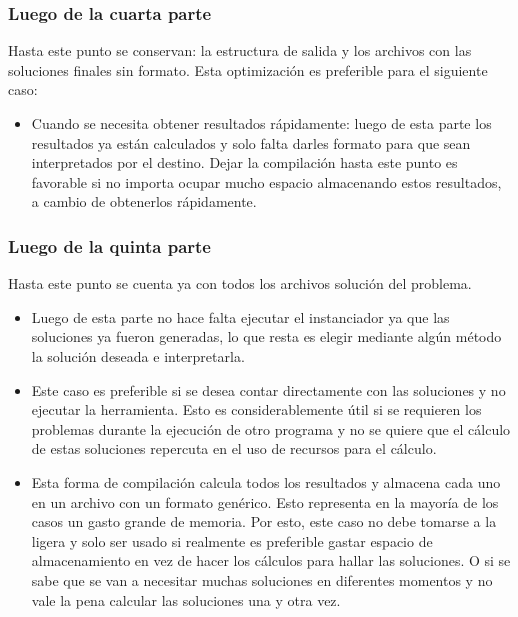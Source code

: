 \subsubsection{Luego de la cuarta parte}
Hasta este punto se conservan: la estructura de salida y los archivos con las 
soluciones finales sin formato. Esta optimización es preferible para el 
siguiente caso:

\begin{itemize}
\item {Cuando se necesita obtener resultados rápidamente: luego de esta parte
los resultados ya están calculados y solo falta darles formato para que
sean interpretados por el destino. Dejar la compilación hasta este punto es 
favorable si no importa ocupar mucho espacio almacenando estos resultados,
a cambio de obtenerlos rápidamente.} 
\end{itemize}

\subsubsection{Luego de la quinta parte}
Hasta este punto se cuenta ya con todos los archivos solución del problema.

\begin{itemize}
\item {Luego de esta parte no hace falta ejecutar el instanciador ya que las 
soluciones ya fueron generadas, lo que resta es elegir mediante algún
método la solución deseada e interpretarla.}

\item{Este caso es preferible si se desea contar directamente con las 
soluciones y no ejecutar la herramienta. Esto es considerablemente útil si 
se requieren los problemas durante la ejecución de otro programa y no se
quiere que el cálculo de estas soluciones repercuta en el uso de recursos
para el cálculo.}

\item{Esta forma de compilación calcula todos los resultados y almacena cada
uno en un archivo con un formato genérico. Esto representa en la mayoría de los
casos un gasto grande de memoria. Por esto, este caso no debe tomarse a la ligera
y solo ser usado si realmente es preferible gastar espacio de almacenamiento
en vez de hacer los cálculos para hallar las soluciones. O si se sabe que se van
a necesitar muchas soluciones en diferentes momentos y no vale la pena 
calcular las soluciones una y otra vez.} 
\end{itemize}

